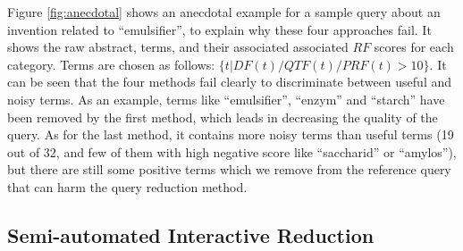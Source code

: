 \vspace*{0.5mm}
Figure \ref{fig:anecdotal} shows an anecdotal example for a sample query about an invention related to ``emulsifier'', to explain why these four approaches fail. It shows the raw abstract, terms, and their associated associated $\mathit{RF}$ scores for each category. Terms are chosen as follows: $\{t| DF(t)/QTF(t)/PRF(t)>10\} $. It can be seen that the four methods fail clearly to discriminate between useful and noisy terms. As an example, terms like ``emulsifier'', ``enzym'' and ``starch'' have been removed by the first method, which leads in decreasing the quality of the query. As for the last method, it contains more noisy terms than useful terms (19 out of 32, and few of them with high negative score like ``saccharid'' or ``amylos''), but there are still some positive terms which we remove from the reference query that can harm the query reduction method.
 


\subsection{Semi-automated Interactive Reduction}

\label{sec:SemiAutomatedInteractiveReduction}

